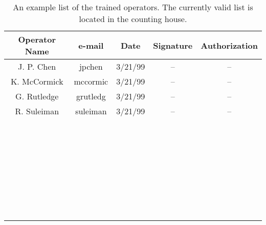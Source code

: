 \begin{table}[htb]
\begin{center}
\begin{tabular}{|c|c|c|c|c|}
\hline 
Operator Name&e-mail&
 Date&
 Signature&
 Authorization\\
\hline 
J. P. Chen&jpchen&
 3/21/99&
 --&
 --\\
\hline 
K. McCormick&mccormic&
 3/21/99&
 --&
 --\\
\hline 
G. Rutledge&grutledg&
 3/21/99&
 --&
 --\\
\hline 
R. Suleiman&suleiman&
3/21/99&
--&
--\\
\hline 
&&
&
&
\\
\hline 
&&
&
&
\\
\hline 
&&
&
&
\\
\hline 
&&
&
&
\\
\hline 
&&
&
&
\\
\hline 
&&
&
&
\\
\hline 
&&
&
&
\\
\hline 
&&
&
&
\\
\hline 
&&
&
&
\\
\hline 
&&
&
&
\\
\hline 
&&
&
&
\\
\hline 
&&
&
&
\\
\hline 
&&
&
&
\\
\hline 
&&
&
&
\\
\hline 
&&
&
&
\\
\hline 
&&
&
&
\\
\hline 
&&
&
&
\\
\hline 
&&
&
&
\\
\hline 
&&
&
&
\\
\hline 
&&
&
&
\\
\hline 
&&
&
&
\\
\hline 
&&
&
&
\\
\hline 
&&
&
&
\\
\hline 
&&
&
&
\\
\hline 
&&
&
&
\\
\hline 
&&
&
&
\\
\hline 
&&
&
&
\\
\hline 
&&
&
&
\\
\hline 
&&
&
&
\\
\hline 
&&
&
&
\\
\hline 
&&
&
&
\\
\hline 
&&
&
&
\\
\hline 
&&
&
&
\\
\hline 
\hline 
\end{tabular}
\end{center}
\caption[Cryotarget: Trained operators]{An example list of the trained operators. The currently valid
         list is located in the counting house.}
\label{tab:targ-operators}
\end{table}

